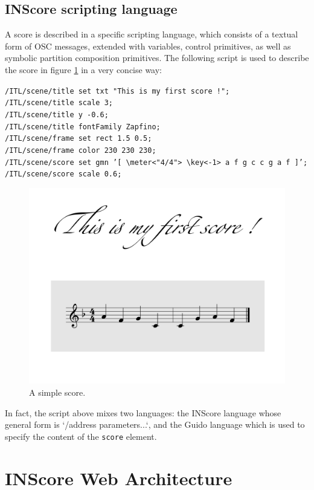 \documentclass{article}
\newcommand{\icode}[1]	{{\small \texttt{#1}}}
\newcommand{\code}[1]	{\vspace{-1em}\begin{center}\colorbox{mygrey}{\begin{minipage}[t]{0.98\columnwidth} {\scriptsize \texttt{#1}}\end{minipage}}\end{center}}
\begin{document}
\subsection{INScore scripting language}
A score is described in a specific scripting language, which consists of a textual form of OSC messages, extended with variables, control primitives, as well as symbolic partition composition primitives. The following script is used to describe the score in figure \ref{fig:score} in a very concise way:
\code{/ITL/scene/title set txt "This is my first score !"; \\
/ITL/scene/title scale 3;\\
/ITL/scene/title y -0.6;\\
/ITL/scene/title fontFamily Zapfino;\\
/ITL/scene/frame set rect 1.5 0.5;\\
/ITL/scene/frame color 230 230 230;\\
/ITL/scene/score set gmn 
   '[ \textbackslash meter<"4/4"> \textbackslash key<-1> a f g c c g a f ]';\\
/ITL/scene/score scale 0.6;}

\begin{figure}[h]
\centering
\includegraphics[width=0.7\columnwidth]{rsrc/inscore-exemple.png}
\caption{A simple score.}
\label{fig:score}
\end{figure}
In fact, the script above mixes two languages: the INScore language whose general form is `/address parameters...`, and the Guido language \cite{hoos98} which is used to specify the content of the \icode{score} element.

\section{INScore Web Architecture}\label{sec:arch}
\end{document}
